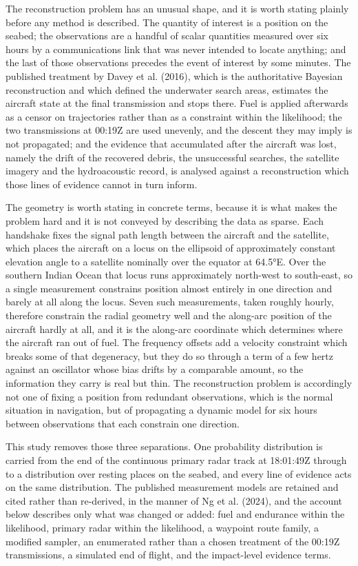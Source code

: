 \documentclass[12pt,a4paper]{article}
\begin{document}
The reconstruction problem has an unusual shape, and it is worth stating plainly before any method is described. The quantity of interest is a position on the seabed; the observations are a handful of scalar quantities measured over six hours by a communications link that was never intended to locate anything; and the last of those observations precedes the event of interest by some minutes. The published treatment by Davey et al. (2016), which is the authoritative Bayesian reconstruction and which defined the underwater search areas, estimates the aircraft state at the final transmission and stops there. Fuel is applied afterwards as a censor on trajectories rather than as a constraint within the likelihood; the two transmissions at 00:19Z are used unevenly, and the descent they may imply is not propagated; and the evidence that accumulated after the aircraft was lost, namely the drift of the recovered debris, the unsuccessful searches, the satellite imagery and the hydroacoustic record, is analysed against a reconstruction which those lines of evidence cannot in turn inform.

The geometry is worth stating in concrete terms, because it is what makes the problem hard and it is not conveyed by describing the data as sparse. Each handshake fixes the signal path length between the aircraft and the satellite, which places the aircraft on a locus on the ellipsoid of approximately constant elevation angle to a satellite nominally over the equator at 64.5°E. Over the southern Indian Ocean that locus runs approximately north-west to south-east, so a single measurement constrains position almost entirely in one direction and barely at all along the locus. Seven such measurements, taken roughly hourly, therefore constrain the radial geometry well and the along-arc position of the aircraft hardly at all, and it is the along-arc coordinate which determines where the aircraft ran out of fuel. The frequency offsets add a velocity constraint which breaks some of that degeneracy, but they do so through a term of a few hertz against an oscillator whose bias drifts by a comparable amount, so the information they carry is real but thin. The reconstruction problem is accordingly not one of fixing a position from redundant observations, which is the normal situation in navigation, but of propagating a dynamic model for six hours between observations that each constrain one direction.

This study removes those three separations. One probability distribution is carried from the end of the continuous primary radar track at 18:01:49Z through to a distribution over resting places on the seabed, and every line of evidence acts on the same distribution. The published measurement models are retained and cited rather than re-derived, in the manner of Ng et al. (2024), and the account below describes only what was changed or added: fuel and endurance within the likelihood, primary radar within the likelihood, a waypoint route family, a modified sampler, an enumerated rather than a chosen treatment of the 00:19Z transmissions, a simulated end of flight, and the impact-level evidence terms.
\end{document}
